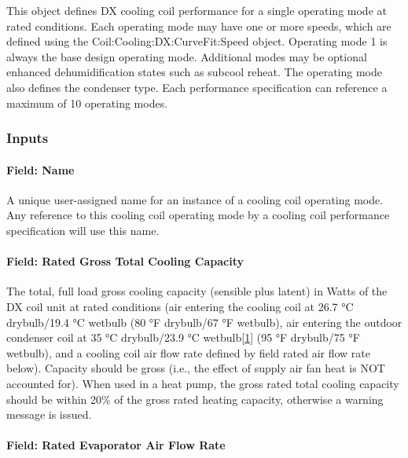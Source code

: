 This object defines DX cooling coil performance for a single operating mode at rated conditions. Each operating mode may have one or more speeds, which are defined using the Coil:Cooling:DX:CurveFit:Speed object. Operating mode 1 is always the base design operating mode. Additional modes may be optional enhanced dehumidification states such as subcool reheat. The operating mode also defines the condenser type. Each performance specification can reference a maximum of 10 operating modes.

\subsubsection{Inputs}\label{inputs-03}

\paragraph{Field: Name}\label{field-name-03}

A unique user-assigned name for an instance of a cooling coil operating mode. Any reference to this cooling coil operating mode by a cooling coil performance specification will use this name.

\paragraph{Field: Rated Gross Total Cooling Capacity}\label{field-rated-gross-total-cooling-capacity-1}

The total, full load gross cooling capacity (sensible plus latent) in Watts of the DX coil unit at rated conditions (air entering the cooling coil at 26.7 °C drybulb/19.4 °C wetbulb (80 °F drybulb/67 °F wetbulb), air entering the outdoor condenser coil at 35 °C drybulb/23.9 °C wetbulb\protect\hyperlink{ux5fftn1}{{[}1{]}} (95 °F drybulb/75 °F wetbulb), and a cooling coil air flow rate defined by field rated air flow rate below). Capacity should be gross (i.e., the effect of supply air fan heat is NOT accounted for). When used in a heat pump, the gross rated total cooling capacity should be within 20\% of the gross rated heating capacity, otherwise a warning message is issued.

\paragraph{Field: Rated Evaporator Air Flow Rate}\label{field-rated-evaporator-air-flow-rate-2}


